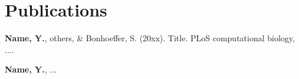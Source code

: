   \section*{Publications}\label{sec:publications}
    \begin{description}[font=\bfseries, align = left, labelwidth = *, leftmargin=*,labelsep=0em]

	    \item \textbf{Name, Y.}, others, \& Bonhoeffer, S. (20xx). Title. PLoS computational biology, ....
	    \item \textbf{Name, Y.}, ...

    \end{description}
